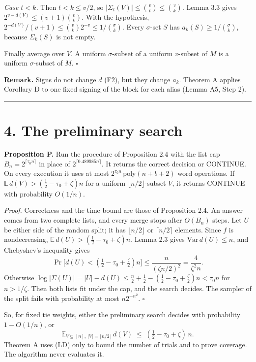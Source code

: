 \documentclass[10pt,a4paper]{article}
\begin{document}
\emph{Case $t < k$.} Then $t < k \le v/2$, so $|\Sigma_t(V)| \le \binom vt \le \binom vk$. Lemma 3.3 gives
$2^{v - d(V)} \le (v+1)\binom vk$. With the hypothesis, $2^{-d(V)}/(v+1) \le \binom vk2^{-v} \le 1/\binom\sigma k$.
Every $\sigma$-set $S$ has $a_k(S) \ge 1/\binom\sigma k$, because $\Sigma_k(S)$ is not empty.

Finally average over $V$. A uniform $\sigma$-subset of a uniform $v$-subset of $M$ is a uniform $\sigma$-subset of $M$.
$\square$

\textbf{Remark.} Signs do not change $d$ (F2), but they change $a_k$. Theorem A applies Corollary D to one fixed signing of
the block for each alias (Lemma A5, Step 2).

\medskip\noindent\rule{\linewidth}{0.4pt}\medskip

\section*{4. The preliminary search}

\textbf{Proposition P.} Run the procedure of Proposition 2.4 with the list cap $B_n = 2^{\lceil\tau_0 n\rceil}$ in place of
$2^{\lceil 0.489985n\rceil}$. It returns the correct decision or CONTINUE. On every execution it uses at most
$2^{\tau_0 n}\,\mathrm{poly}(n+b+2)$ word operations. If $\mathbb E\, d(V) > (\tfrac12 - \tau_0 + \zeta)n$ for a uniform
$\lfloor n/2\rfloor$-subset $V$, it returns CONTINUE with probability $O(1/n)$.

\emph{Proof.} Correctness and the time bound are those of Proposition 2.4. An answer comes from two complete lists, and
every merge stops after $O(B_n)$ steps. Let $U$ be either side of the random split; it has $\lfloor n/2\rfloor$ or
$\lceil n/2\rceil$ elements. Since $f$ is nondecreasing, $\mathbb E\, d(U) > (\tfrac12 - \tau_0 + \zeta)n$. Lemma 2.3 gives
$\mathrm{Var}\, d(U) \le n$, and Chebyshev's inequality gives
\[\Pr\big[d(U) < (\tfrac12 - \tau_0 + \tfrac\zeta2)n\big] \le \frac{n}{(\zeta n/2)^2} = \frac{4}{\zeta^2n}.\]
Otherwise $\log|\Sigma(U)| = |U| - d(U) \le \tfrac n2 + \tfrac12 - (\tfrac12 - \tau_0 + \tfrac\zeta2)n < \tau_0 n$ for
$n > 1/\zeta$. Then both lists fit under the cap, and the search decides. The sampler of the split fails with
probability at most $n2^{-n^2}$. $\square$

So, for fixed tie weights, either the preliminary search decides with probability $1 - O(1/n)$, or
\[\mathbb E_{V\subseteq[n],\ |V| = \lfloor n/2\rfloor}\, d(V) \;\le\; (\tfrac12 - \tau_0 + \zeta)\,n. \tag{LD}\]
Theorem A uses (LD) only to bound the number of trials and to prove coverage. The algorithm never evaluates it.
\end{document}
